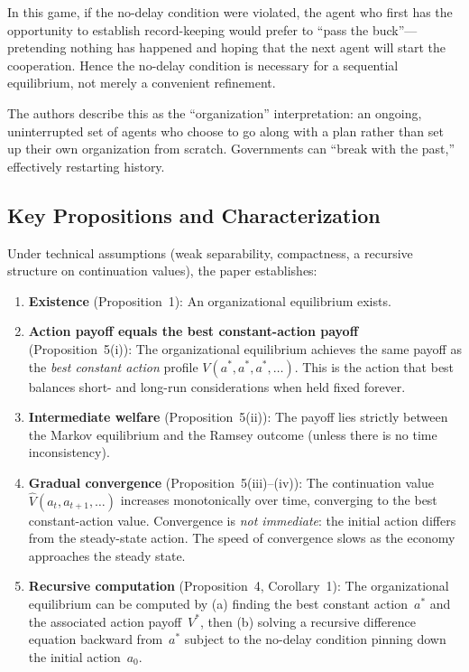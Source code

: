 \documentclass[12pt]{article}
\begin{document}
In this game, if the no-delay condition were violated, the agent who first has
the opportunity to establish record-keeping would prefer to ``pass the buck''---
pretending nothing has happened and hoping that the next agent will start the
cooperation.  Hence the no-delay condition is necessary for a sequential
equilibrium, not merely a convenient refinement.

The authors describe this as the ``organization'' interpretation: an ongoing,
uninterrupted set of agents who choose to go along with a plan rather than set
up their own organization from scratch.  Governments can ``break with the
past,'' effectively restarting history.

\subsection{Key Propositions and Characterization}

Under technical assumptions (weak separability, compactness, a recursive
structure on continuation values), the paper establishes:

\begin{enumerate}[label=(\roman*)]
  \item \textbf{Existence} (Proposition~1): An organizational equilibrium exists.

  \item \textbf{Action payoff equals the best constant-action payoff}
  (Proposition~5(i)): The organizational equilibrium achieves the same payoff as
  the \emph{best constant action} profile $V(a^*, a^*, a^*, \ldots)$.  This is the
  action that best balances short- and long-run considerations when held fixed
  forever.

  \item \textbf{Intermediate welfare} (Proposition~5(ii)): The payoff lies
  strictly between the Markov equilibrium and the Ramsey outcome (unless there
  is no time inconsistency).

  \item \textbf{Gradual convergence} (Proposition~5(iii)--(iv)): The continuation
  value $\hat V(a_t, a_{t+1}, \ldots)$ increases monotonically over time,
  converging to the best constant-action value.  Convergence is \emph{not
  immediate}: the initial action differs from the steady-state action.  The
  speed of convergence slows as the economy approaches the steady state.

  \item \textbf{Recursive computation} (Proposition~4, Corollary~1): The
  organizational equilibrium can be computed by (a) finding the best constant
  action~$a^*$ and the associated action payoff~$V^*$, then (b) solving a
  recursive difference equation backward from~$a^*$ subject to the no-delay
  condition pinning down the initial action~$a_0$.
\end{enumerate}
\end{document}
